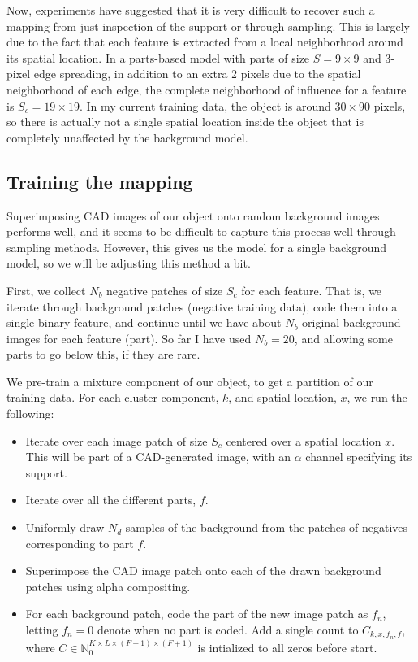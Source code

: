 \documentclass{article}
\begin{document}
Now, experiments have suggested that it is very difficult to recover such a mapping from just inspection of the support or through sampling. This is largely due to the fact that each feature is extracted from a local neighborhood around its spatial location. In a parts-based model with parts of size $S = 9 \times 9$ and 3-pixel edge spreading, in addition to an extra 2 pixels due to the spatial neighborhood of each edge, the complete neighborhood of influence for a feature is $S_c = 19 \times 19$. In my current training data, the object is around $30 \times 90$ pixels, so there is actually not a single spatial location inside the object that is completely unaffected by the background model.

\subsection{Training the mapping}
Superimposing CAD images of our object onto random background images performs well, and it seems to be difficult to capture this process well through sampling methods. However, this gives us the model for a single background model, so we will be adjusting this method a bit.

First, we collect $N_b$ negative patches of size $S_c$ for each feature. That is, we iterate through background patches (negative training data), code them into a single binary feature, and continue until we have about $N_b$ original background images for each feature (part). So far I have used $N_b = 20$, and allowing some parts to go below this, if they are rare.

We pre-train a mixture component of our object, to get a partition of our training data. For each cluster component, $k$, and spatial location, $x$, we run the following:

\begin{itemize}
\item Iterate over each image patch of size $S_c$ centered over a spatial location $x$. This will be part of a CAD-generated image, with an $\alpha$ channel specifying its support.

\item Iterate over all the different parts, $f$.

\item Uniformly draw $N_d$ samples of the background from the patches of negatives corresponding to part $f$.

\item Superimpose the CAD image patch onto each of the drawn background patches using alpha compositing.

\item For each background patch, code the part of the new image patch as $f_n$, letting $f_n = 0$ denote when no part is coded. Add a single count to $C_{k,x,f_n,f}$, where $C \in \mathbb{N}_0^{K \times L \times (F+1) \times (F+1)}$ is intialized to all zeros before start.
\end{itemize}
\end{document}
